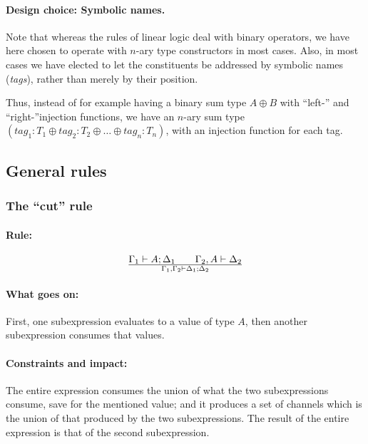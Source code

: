 \documentclass[a4paper]{article}
\begin{document}
\paragraph{Design choice: Symbolic names.}
Note that whereas the rules of linear logic deal with binary
operators, we have here chosen to operate with $n$-ary type
constructors in most cases.  Also, in most cases we have elected to
let the constituents be addressed by symbolic names (\emph{tags}),
rather than merely by their position.

Thus, instead of for example having a binary sum type $A \oplus B$
with ``left-'' and ``right-''injection functions, we have an $n$-ary
sum type $(\mathit{tag}_1:T_1 \oplus \mathit{tag}_2:T_2 \oplus \ldots
\oplus \mathit{tag}_n:T_n)$, with an injection function for each tag.


\subsection{General rules}

\subsubsection{The ``cut'' rule}
\paragraph{Rule:}
$$
{
  \Gamma_1 \vdash A; \Delta_1
  \qquad
  \Gamma_2,A \vdash \Delta_2
}\over{
  \Gamma_1, \Gamma_2 \vdash \Delta_1; \Delta_2
}
$$

\paragraph{What goes on:} First, one subexpression evaluates to a
value of type $A$, then another subexpression consumes that values.

\paragraph{Constraints and impact:} The entire expression consumes the
union of what the two subexpressions consume, save for the mentioned
value; and it produces a set of channels which is the union of that
produced by the two subexpressions. The result of the entire
expression is that of the second subexpression.
\end{document}
